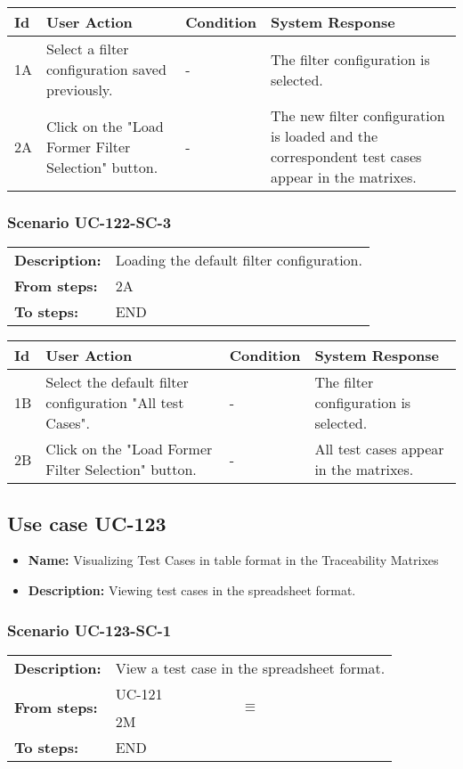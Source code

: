 \documentclass[a4paper,11pt]{article}
\newcommand{\bl}{\\ \hline}
\begin{document}
\begin{tabular}{|p{0.8in}|p{1.6in}|p{1.6in}|p{1.6in}|}
\hline
Id & User Action & Condition & System Response  \bl 
1A & Select a filter configuration saved previously. & - & The filter configuration is selected. \bl 
2A & Click on the "Load Former Filter Selection" button. & - & The new filter configuration is loaded and the correspondent test cases appear in the matrixes. \bl 
\end{tabular}
\subsubsection*{Scenario UC-122-SC-3}
\begin{tabular}{p{1in}p{4in}}
{\bf Description:} & Loading the default filter configuration. \\
{\bf From steps:} & 2A \\
{\bf To steps:} & END \\
\end{tabular}
 
\begin{tabular}{|p{0.8in}|p{1.6in}|p{1.6in}|p{1.6in}|}
\hline
Id & User Action & Condition & System Response  \bl 
1B & Select the default filter configuration "All test Cases". & - & The filter configuration is selected. \bl 
2B & Click on the "Load Former Filter Selection" button. & - & All test cases appear in the matrixes. \bl 
\end{tabular}
\subsection*{Use case UC-123}
\begin{itemize}
\item {\bf Name: }Visualizing Test Cases in table format in the Traceability Matrixes
\item {\bf Description: }Viewing test cases in the spreadsheet format.
\end{itemize}
\subsubsection*{Scenario UC-123-SC-1}
\begin{tabular}{p{1in}p{4in}}
{\bf Description:} & View a test case in the spreadsheet format. \\
{\bf From steps:} & UC-121$$\equiv$$2M \\
{\bf To steps:} & END \\
\end{tabular}
 
\end{document}
